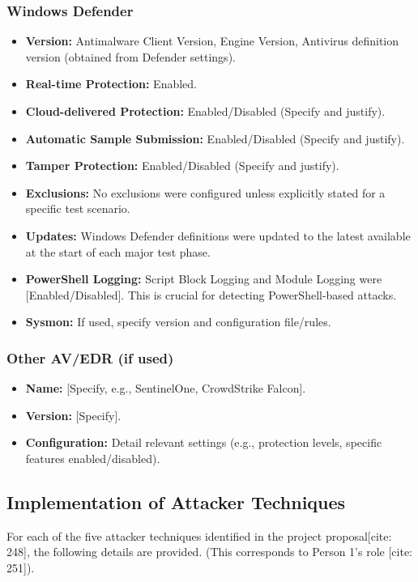 \documentclass[11pt]{article}
\begin{document}
	\subsubsection{Windows Defender}
	\begin{itemize}
		\item \textbf{Version:} Antimalware Client Version, Engine Version, Antivirus definition version (obtained from Defender settings).
		\item \textbf{Real-time Protection:} Enabled.
		\item \textbf{Cloud-delivered Protection:} Enabled/Disabled (Specify and justify).
		\item \textbf{Automatic Sample Submission:} Enabled/Disabled (Specify and justify).
		\item \textbf{Tamper Protection:} Enabled/Disabled (Specify and justify).
		\item \textbf{Exclusions:} No exclusions were configured unless explicitly stated for a specific test scenario.
		\item \textbf{Updates:} Windows Defender definitions were updated to the latest available at the start of each major test phase.
		\item \textbf{PowerShell Logging:} Script Block Logging and Module Logging were [Enabled/Disabled]. This is crucial for detecting PowerShell-based attacks.
		\item \textbf{Sysmon:} If used, specify version and configuration file/rules.
	\end{itemize}
	
	\subsubsection{Other AV/EDR (if used)}
	\begin{itemize}
		\item \textbf{Name:} [Specify, e.g., SentinelOne, CrowdStrike Falcon].
		\item \textbf{Version:} [Specify].
		\item \textbf{Configuration:} Detail relevant settings (e.g., protection levels, specific features enabled/disabled).
	\end{itemize}
	
	\subsection{Implementation of Attacker Techniques}
	For each of the five attacker techniques identified in the project proposal[cite: 248], the following details are provided. (This corresponds to Person 1's role [cite: 251]).
	
\end{document}
